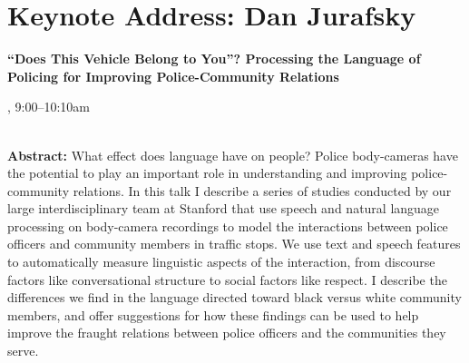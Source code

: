 \section{Keynote Address: Dan Jurafsky}

\begin{center}
\begin{Large}
{\bfseries\Large ``Does This Vehicle Belong to You''? Processing the Language of Policing for Improving Police-Community Relations}\vspace{1em}\par
\end{Large}


\daydateyear, 9:00--10:10am \vspace{1em}\\
\PlenaryLoc \\
\vspace{1em}\par
\end{center}

\noindent
{\bfseries Abstract:} What effect does language have on people?
   Police body-cameras have the potential to play an important
role in understanding and improving police-community relations.
In this talk I describe a series of studies conducted by our
large interdisciplinary team at Stanford that use speech and
natural language processing on body-camera recordings to model the interactions
between police officers and community members in traffic stops.
We use text and speech features to automatically measure linguistic aspects of the interaction,
from discourse factors like conversational structure to social factors like respect.
I describe the differences we find in the language directed toward black versus white community members,
and offer suggestions for how these findings can be used to help improve the fraught relations between
police officers and the communities they serve.

\vspace{3em}\par 


